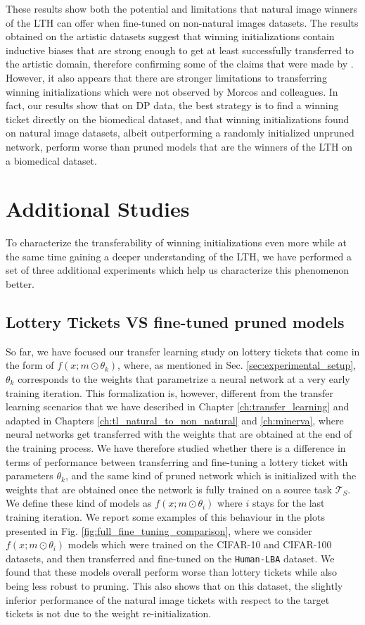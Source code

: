 These results show both the potential and limitations that natural image winners of the LTH can offer when fine-tuned on non-natural images datasets. The results obtained on the artistic datasets suggest that winning initializations contain inductive biases that are strong enough to get at least successfully transferred to the artistic domain, therefore confirming some of the claims that were made by \citet{morcos2019one}. However, it also appears that there are stronger limitations to transferring winning initializations which were not observed by Morcos and colleagues. In fact, our results show that on DP data, the best strategy is to find a winning ticket directly on the biomedical dataset, and that winning initializations found on natural image datasets, albeit outperforming a randomly initialized unpruned network, perform worse than pruned models that are the winners of the LTH on a biomedical dataset.

\section{Additional Studies}
\label{sec:additional_studies}
To characterize the transferability of winning initializations even more while at the same time gaining a deeper understanding of the LTH, we have performed a set of three additional experiments which help us characterize this phenomenon better. 

\subsection{Lottery Tickets VS fine-tuned pruned models}
So far, we have focused our transfer learning study on lottery tickets that come in the form of $f(x;m\odot\theta_k)$, where, as mentioned in Sec. \ref{sec:experimental_setup}, $\theta_k$ corresponds to the weights that parametrize a neural network at a very early training iteration. This formalization is, however, different from the transfer learning scenarios that we have described in Chapter \ref{ch:transfer_learning} and adapted in Chapters \ref{ch:tl_natural_to_non_natural} and \ref{ch:minerva}, where neural networks get transferred with the weights that are obtained at the end of the training process. We have therefore studied whether there is a difference in terms of performance between transferring and fine-tuning a lottery ticket with parameters $\theta_k$, and the same kind of pruned network which is initialized with the weights that are obtained once the network is fully trained on a source task $\mathcal{T}_S$. We define these kind of models as $f(x;m\odot\theta_i)$ where $i$ stays for the last training iteration. We report some examples of this behaviour in the plots presented in Fig. \ref{fig:full_fine_tuning_comparison}, where we consider $f(x;m\odot\theta_i)$ models which were trained on the CIFAR-10 and CIFAR-100 datasets, and then transferred and fine-tuned on the \texttt{Human-LBA} dataset. We found that these models overall perform worse than lottery tickets while also being less robust to pruning. This also shows that on this dataset, the slightly inferior performance of the natural image tickets with respect to the target tickets is not due to the weight re-initialization.

